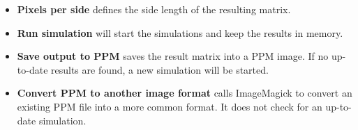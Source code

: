 \documentclass[a4paper,12pt]{article}
\begin{document}
\begin{itemize}
\begin{itemize}
  \item \textbf{Pixels per side} defines the side length of the resulting matrix.
  \item \textbf{Run simulation} will start the simulations and keep the results in memory.
  \item \textbf{Save output to PPM} saves the result matrix into a PPM image.
  If no up-to-date results are found, a new simulation will be started.
  \item \textbf{Convert PPM to another image format} calls ImageMagick to convert an existing PPM file
  into a more common format. It does not check for an up-to-date simulation.
 \end{itemize}


\end{itemize}
\end{document}

